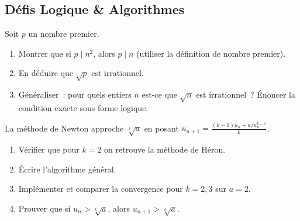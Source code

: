 \subsection*{D\'efis Logique \& Algorithmes}

\begin{challenge}
Soit $p$ un nombre premier.
\begin{enumerate}
  \item Montrer que si $p\mid n^2$, alors $p\mid n$
        (utiliser la d\'efinition de nombre premier).
  \item En d\'eduire que $\sqrt{p}$ est irrationnel.
  \item G\'en\'eraliser~: pour quels entiers $n$ est-ce que $\sqrt{n}$ est irrationnel~?
        \'Enoncer la condition exacte sous forme logique.
\end{enumerate}
\end{challenge}

\begin{challenge}
La m\'ethode de Newton approche $\sqrt[k]{a}$ en posant $u_{n+1}=\frac{(k-1)u_n+a/u_n^{k-1}}{k}$.
\begin{enumerate}
  \item V\'erifier que pour $k=2$ on retrouve la m\'ethode de H\'eron.
  \item \'Ecrire l'algorithme g\'en\'eral.
  \item Impl\'ementer et comparer la convergence pour $k=2,3$ sur $a=2$.
  \item Prouver que si $u_n>\sqrt[k]{a}$, alors $u_{n+1}>\sqrt[k]{a}$.
\end{enumerate}
\end{challenge}




